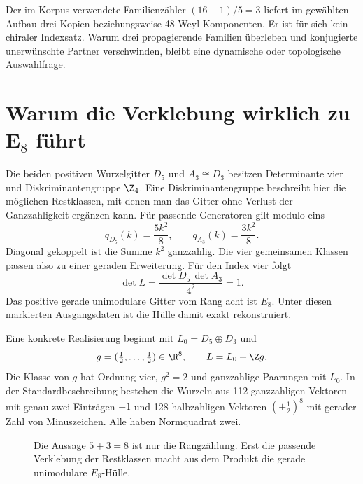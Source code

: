 Der im Korpus verwendete Familienzähler $(16-1)/5=3$ liefert im gewählten Aufbau drei Kopien beziehungsweise 48 Weyl-Komponenten. Er ist für sich kein chiraler Indexsatz. Warum drei propagierende Familien überleben und konjugierte unerwünschte Partner verschwinden, bleibt eine dynamische oder topologische Auswahlfrage.

\section{Warum die Verklebung wirklich zu E\texorpdfstring{$_8$}{8} führt}
Die beiden positiven Wurzelgitter $D_5$ und $A_3\cong D_3$ besitzen Determinante vier und Diskriminantengruppe $\Z_4$. Eine Diskriminantengruppe beschreibt hier die möglichen Restklassen, mit denen man das Gitter ohne Verlust der Ganzzahligkeit ergänzen kann. Für passende Generatoren gilt modulo eins
\begin{equation}
q_{D_5}(k)=\frac{5k^2}{8},\qquad
q_{A_3}(k)=\frac{3k^2}{8}.
\end{equation}
Diagonal gekoppelt ist die Summe $k^2$ ganzzahlig. Die vier gemeinsamen Klassen passen also zu einer geraden Erweiterung. Für den Index vier folgt
\begin{equation}
\det L=\frac{\det D_5\,\det A_3}{4^2}=1.
\end{equation}
Das positive gerade unimodulare Gitter vom Rang acht ist $E_8$. Unter diesen markierten Ausgangsdaten ist die Hülle damit exakt rekonstruiert. 

Eine konkrete Realisierung beginnt mit $L_0=D_5\oplus D_3$ und
\begin{equation}
g=(\tfrac12,\ldots,\tfrac12)\in\R^8,
\qquad L=L_0+\Z g.
\end{equation}
Die Klasse von $g$ hat Ordnung vier, $g^2=2$ und ganzzahlige Paarungen mit $L_0$. In der Standardbeschreibung bestehen die Wurzeln aus 112 ganzzahligen Vektoren mit genau zwei Einträgen $\pm1$ und 128 halbzahligen Vektoren $(\pm\frac12)^8$ mit gerader Zahl von Minuszeichen. Alle haben Normquadrat zwei.

\begin{figure}[H]\centering
{}
\caption{Die Aussage $5+3=8$ ist nur die Rangzählung. Erst die passende Verklebung der Restklassen macht aus dem Produkt die gerade unimodulare $E_8$-Hülle.}
\end{figure}

